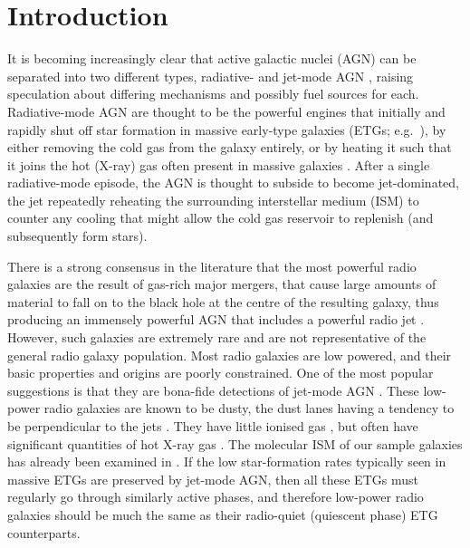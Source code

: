 \documentclass[a4paper,fleqn,usenatbib]{mnras}
\begin{document}


\section{Introduction}
\label{sec:intro}

It is becoming increasingly clear that active galactic nuclei (AGN)
can be separated into two different types, radiative- and jet-mode AGN
\citep[e.g.][]{Antonucci2012, Heckman2014}, raising speculation about
differing mechanisms and possibly fuel sources for
each. Radiative-mode AGN are thought to be the powerful engines that
initially and rapidly shut off star formation in massive early-type
galaxies (ETGs; e.g.\ \citealt{Thomas2005, Thomas2010}), by either
removing the cold gas from the galaxy entirely, or by heating it such
that it joins the hot (X-ray) gas often present in massive galaxies
\citep[e.g.][]{OSullivan2001}.
After a single radiative-mode episode, the AGN is thought to subside
to become jet-dominated, the jet repeatedly reheating the surrounding
interstellar medium (ISM) to counter any cooling that might allow the
cold gas reservoir to replenish (and subsequently form stars).

There is a strong consensus in the literature that the most powerful
radio galaxies are the result of gas-rich major mergers, that cause
large amounts of material to fall on to the black hole at the centre
of the resulting galaxy, thus producing an immensely powerful AGN that
includes a powerful radio jet \citep[e.g.][]{Malin1983, Quillen1992,
  Lim2000}. However, such galaxies are extremely rare and are not
representative of the general radio galaxy population. Most radio
galaxies are low powered, and their basic properties and origins are
poorly constrained. One of the most popular suggestions is that they
are bona-fide detections of jet-mode AGN \citep[e.g.][]{Heckman2014}.
These low-power radio galaxies are known to be dusty, the dust lanes
having a tendency to be perpendicular to the jets
\citep[e.g.][]{DeRuiter2002, VerdoesKleijn2005}. They have little
ionised gas \citep[e.g.][]{Sarzi2005}, but often have significant
quantities of hot X-ray gas \citep[e.g.][]{Canizares1987}. The
molecular ISM of our sample galaxies has already been examined in
\citet{ruffa2019a, ruffa2019b}. If the low star-formation rates
typically seen in massive ETGs are preserved by jet-mode AGN, then all
these ETGs must regularly go through similarly active phases, and
therefore low-power radio galaxies should be much the same as their
radio-quiet (quiescent phase) ETG counterparts.
\end{document}
